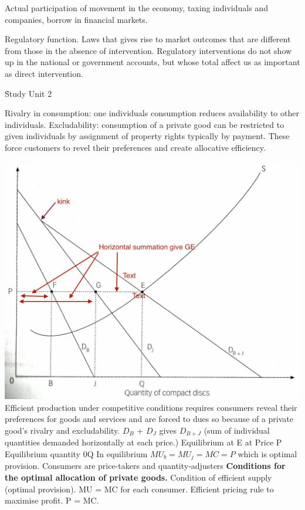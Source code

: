 \documentclass[12pt]{examnotes}
\begin{document}
\ra Actual participation of movement in the economy, taxing individuals and companies, borrow in financial markets.

\ra Regulatory function. Laws that gives rise to market outcomes that are different from those in the absence of intervention.
\ra Regulatory interventions do not show up in the national or government accounts, but whose total affect us as important as direct intervention.

\ra {}

\h{Study Unit 2}

\ra Rivalry in consumption: one individuals consumption reduces availability to other individuals.
\ra Excludability: consumption of a private good can be restricted to given individuals by assignment of property rights typically by payment.
\ra These force customers to revel their preferences and create allocative efficiency.

\includegraphics[scale=0.25]{./imgs/31.jpg}
\ra Efficient production under competitive conditions requires consumers reveal their preferences for goods and services and are forced to dues so because of a private good's rivalry and excludability.
\ra $D_B$ + $D_J$ gives $D_{B+J}$ (sum of individual quantities demanded horizontally at each price.)
\ra Equilibrium at E at Price P
\ra Equilibrium quantity 0Q 
\ra In equilibrium $MU_b=MU_j = MC = P$ which is optimal provision.
\ra Consumers are price-takers and quantity-adjusters
{\bf Conditions for the optimal allocation of private goods.}
\ra Condition of efficient supply (optimal provision). MU = MC for each consumer.
\ra Efficient pricing rule to maximise profit. P = MC. 
\end{document}

